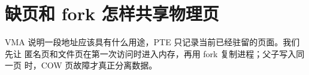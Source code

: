 \chapter{缺页和 fork 怎样共享物理页}

VMA 说明一段地址应该具有什么用途，PTE 只记录当前已经驻留的页面。我们先让
匿名页和文件页在第一次访问时进入内存，再用 fork 复制进程；父子写入同一页
时，COW 页故障才真正分离数据。






